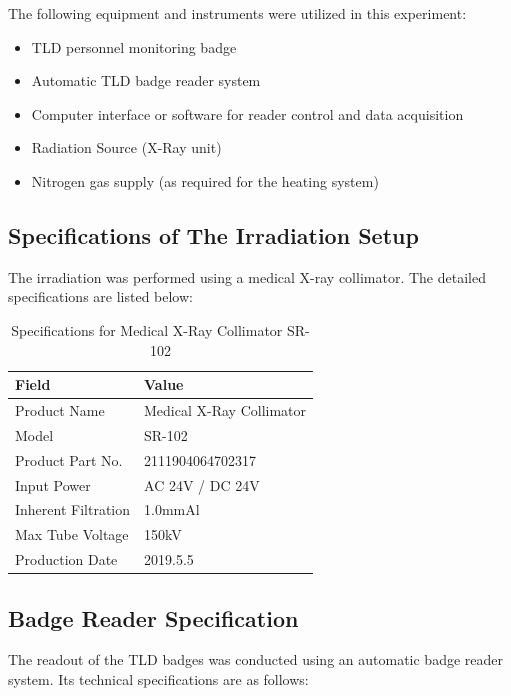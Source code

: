 The following equipment and instruments were utilized in this experiment:
\begin{itemize}
    \item TLD personnel monitoring badge
    \item Automatic TLD badge reader system
    \item Computer interface or software for reader control and data acquisition
    \item Radiation Source (X-Ray unit)
    \item Nitrogen gas supply (as required for the heating system)
\end{itemize}


\subsection{Specifications of The Irradiation Setup}
The irradiation was performed using a medical X-ray collimator. The detailed specifications are listed below:

\begin{table}[H]
    \centering
    \caption{Specifications for Medical X-Ray Collimator SR-102}
    \begin{tabular}{|l|l|}
        \hline
        \textbf{Field} & \textbf{Value} \\
        \hline
        Product Name & Medical X-Ray Collimator \\
        Model & SR-102 \\
        Product Part No. & 2111904064702317 \\
        Input Power & AC 24V / DC 24V \\
        Inherent Filtration & 1.0mmAl \\
        Max Tube Voltage & 150kV \\
        Production Date & 2019.5.5 \\
        \hline
    \end{tabular}
\end{table}

\subsection{Badge Reader Specification}
The readout of the TLD badges was conducted using an automatic badge reader system. Its technical specifications are as follows:

